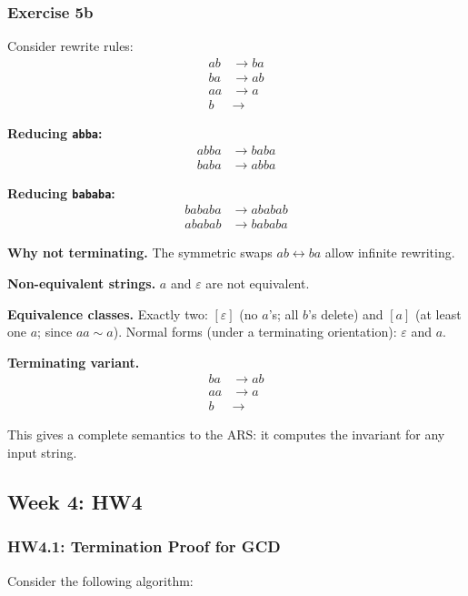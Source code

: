 \documentclass{article}
\theoremstyle{theorem}
\theoremstyle{definition}
\theoremstyle{remark}
\begin{document}
\subsubsection*{Exercise 5b}

Consider rewrite rules:
\begin{align*}
ab &\rightarrow ba \\
ba &\rightarrow ab \\
aa &\rightarrow a \\
b &\rightarrow
\end{align*}

\textbf{Reducing \texttt{abba}:}
\begin{align*}
abba &\rightarrow baba \\
baba &\rightarrow abba
\end{align*}

\textbf{Reducing \texttt{bababa}:}
\begin{align*}
bababa &\rightarrow ababab \\
ababab &\rightarrow bababa
\end{align*}

\textbf{Why not terminating.} The symmetric swaps $ab \leftrightarrow ba$ allow infinite rewriting.

\textbf{Non-equivalent strings.} $a$ and $\varepsilon$ are not equivalent.

\textbf{Equivalence classes.} Exactly two: $[\varepsilon]$ (no $a$'s; all $b$'s delete) and $[a]$ (at least one $a$; since $aa \sim a$).
Normal forms (under a terminating orientation): $\varepsilon$ and $a$.

\textbf{Terminating variant.}
\begin{align*}
ba &\rightarrow ab \\
aa &\rightarrow a \\
b &\rightarrow
\end{align*}


This gives a complete semantics to the ARS: it computes the invariant for any input string.

\subsection{Week 4: HW4}

\subsubsection{HW4.1: Termination Proof for GCD}

Consider the following algorithm:
\end{document}
